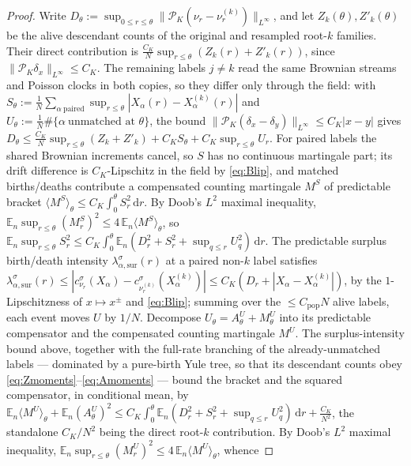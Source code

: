 \documentclass[a4paper,fleqn]{cas-sc}
\theoremstyle{definition}
\theoremstyle{remark}
\begin{document}
\begin{proof}
Write $D_\theta:=\sup_{0\le r\le\theta}\|\mathcal P_K(\nu_r-\nu^{(k)}_r)\|_{L^\infty}$, and let
$Z_k(\theta),Z'_k(\theta)$ be the alive descendant counts of the original and resampled root-$k$
families. Their direct contribution is $\frac{C_K}N\sup_{r\le\theta}(Z_k(r)+Z'_k(r))$, since
$\|\mathcal P_K\delta_x\|_{L^\infty}\le C_K$. The remaining labels $j\ne k$ read the same Brownian
streams and Poisson clocks in both copies, so they differ only through the field: with
$S_\theta:=\frac1N\sum_{\alpha\ \mathrm{paired}}\sup_{r\le\theta}|X_\alpha(r)-X^{(k)}_\alpha(r)|$ and
$U_\theta:=\frac1N\#\{\alpha\ \text{unmatched at }\theta\}$, the bound
$\|\mathcal P_K(\delta_x-\delta_y)\|_{L^\infty}\le C_K|x-y|$ gives
$D_\theta\le\frac{C_K}N\sup_{r\le\theta}(Z_k+Z'_k)+C_KS_\theta+C_K\sup_{r\le\theta}U_r$. For paired
labels the shared Brownian increments cancel, so $S$ has no continuous martingale part; its drift
difference is $C_K$-Lipschitz in the field by \eqref{eq:Blip}, and matched births/deaths contribute a
compensated counting martingale $M^S$ of predictable bracket $\langle M^S\rangle_\theta\le C_K\int_0^\theta S_r^2\,\mathrm dr$.
By Doob's $L^2$ maximal inequality, $\mathbb E_n\sup_{r\le\theta}(M^S_r)^2\le4\,\mathbb E_n\langle M^S\rangle_\theta$,
so $\mathbb E_n\sup_{r\le\theta}S_r^2\le C_K\int_0^\theta\mathbb E_n(D_r^2+S_r^2+\sup_{q\le r}U_q^2)\,\mathrm dr$.
The predictable surplus birth/death intensity $\lambda^\sigma_{\alpha,\mathrm{sur}}(r)$ at a paired non-$k$
label satisfies
$\lambda^\sigma_{\alpha,\mathrm{sur}}(r)\le|c^\sigma_{\nu_r}(X_\alpha)-c^\sigma_{\nu^{(k)}_r}(X^{(k)}_\alpha)|\le C_K(D_r+|X_\alpha-X^{(k)}_\alpha|)$,
by the $1$-Lipschitzness of $x\mapsto x^\pm$ and \eqref{eq:Blip}; summing over the $\le C_{\mathrm{pop}}N$
alive labels, each event moves $U$ by $1/N$. Decompose $U_\theta=A^U_\theta+M^U_\theta$ into its predictable
compensator and the compensated counting martingale $M^U$. The surplus-intensity bound above, together with
the full-rate branching of the already-unmatched labels --- dominated by a pure-birth Yule tree, so that its
descendant counts obey \eqref{eq:Zmoments}--\eqref{eq:Amoments} --- bound the bracket and the squared
compensator, in conditional mean, by
$\mathbb E_n\langle M^U\rangle_\theta+\mathbb E_n(A^U_\theta)^2\le C_K\int_0^\theta\mathbb E_n(D_r^2+S_r^2+\sup_{q\le r}U_q^2)\,\mathrm dr+\frac{C_K}{N^2}$,
the standalone $C_K/N^2$ being the direct root-$k$ contribution. By Doob's $L^2$ maximal inequality,
$\mathbb E_n\sup_{r\le\theta}(M^U_r)^2\le4\,\mathbb E_n\langle M^U\rangle_\theta$, whence

\end{proof}
\end{document}
